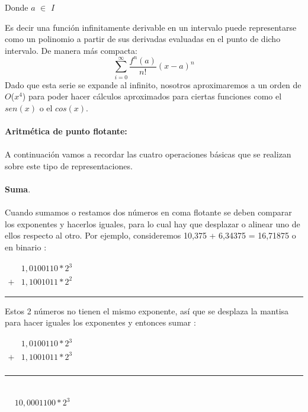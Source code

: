 \documentclass[10pt,a4paper]{article}
\begin{document}
\begin{multicols}{2}
\begin{center}
Donde $a$ $\in$ $I$
\end{center}
Es decir una funci\'on infinitamente derivable en un intervalo puede representarse como un polinomio a partir de sus derivadas evaluadas en el punto  de dicho intervalo. De manera más compacta:\\
\begin{equation}
\sum_{i=0}^\infty\frac{{f}^{n}{(a)}}{n!}{(x-a)^{n}}
\end{equation}
Dado que esta serie se expande al infinito, nosotros aproximaremos a un orden de $O$($x^{4}$) para poder hacer c\'alculos aproximados para ciertas funciones como el $sen(x)$ o el $cos(x)$.\\\\
\textbf{Aritm\'etica de punto flotante:}\\\\
A continuaci\'on vamos a recordar las cuatro operaciones b\'asicas que se realizan sobre este tipo de
representaciones.\\\\
\textbf{Suma}.\\\\
Cuando sumamos o restamos dos n\'umeros en coma flotante se deben comparar los exponentes y
hacerlos iguales, para lo cual hay que desplazar o alinear uno de ellos respecto al otro. Por ejemplo, consideremos 10,375 + 6,34375 = 16,71875 o en binario : \\
\begin{center}
$\begin{matrix}
  & 1,0100110 * 2^{3} \\
+ & 1,1001011 * 2^{2}
\end{matrix}$\\
\rule{30mm}{0.1mm}
\end{center}
Estos 2 n\'umeros no tienen el mismo exponente, as\'i que se desplaza la mantisa para hacer iguales los exponentes y entonces sumar :\\
\begin{center}
$\begin{matrix}
  & 1,0100110 * 2^{3} \\
+ & 1,1001011 * 2^{3} \\
\end{matrix}$\\
\rule{30mm}{0.1mm}\\
$\begin{matrix}
  & 10,0001100 * 2^{3}
\end{matrix}$

\end{center}
\end{multicols}
\end{document}
